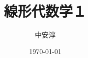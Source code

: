 \documentclass{jsbook}
\theoremstyle{definition}
\theoremstyle{remark}
\numberwithin{equation}{section}
\begin{document}
\title{線形代数学１}
\author{中安淳}
\date{\today}

\maketitle

% 

\tableofcontents














\printindex
\end{document}
